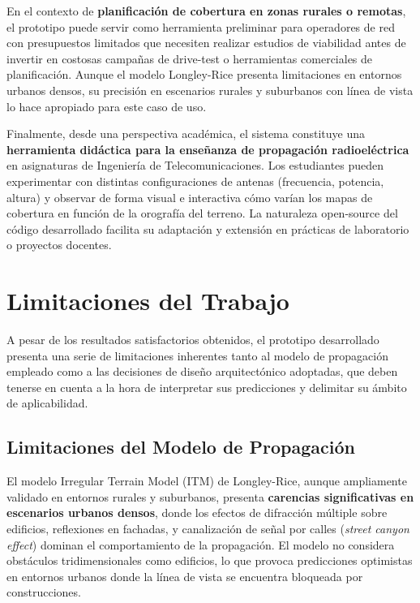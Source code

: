 En el contexto de \textbf{planificación de cobertura en zonas rurales o remotas}, el prototipo puede servir como herramienta preliminar para operadores de red con presupuestos limitados que necesiten realizar estudios de viabilidad antes de invertir en costosas campañas de drive-test o herramientas comerciales de planificación. Aunque el modelo Longley-Rice presenta limitaciones en entornos urbanos densos, su precisión en escenarios rurales y suburbanos con línea de vista lo hace apropiado para este caso de uso.

Finalmente, desde una perspectiva académica, el sistema constituye una \textbf{herramienta didáctica para la enseñanza de propagación radioeléctrica} en asignaturas de Ingeniería de Telecomunicaciones. Los estudiantes pueden experimentar con distintas configuraciones de antenas (frecuencia, potencia, altura) y observar de forma visual e interactiva cómo varían los mapas de cobertura en función de la orografía del terreno. La naturaleza open-source del código desarrollado facilita su adaptación y extensión en prácticas de laboratorio o proyectos docentes.

\section{Limitaciones del Trabajo}
\label{sec:limitaciones_trabajo}

A pesar de los resultados satisfactorios obtenidos, el prototipo desarrollado presenta una serie de limitaciones inherentes tanto al modelo de propagación empleado como a las decisiones de diseño arquitectónico adoptadas, que deben tenerse en cuenta a la hora de interpretar sus predicciones y delimitar su ámbito de aplicabilidad.

\subsection*{Limitaciones del Modelo de Propagación}

El modelo Irregular Terrain Model (ITM) de Longley-Rice, aunque ampliamente validado en entornos rurales y suburbanos, presenta \textbf{carencias significativas en escenarios urbanos densos}, donde los efectos de difracción múltiple sobre edificios, reflexiones en fachadas, y canalización de señal por calles (\textit{street canyon effect}) dominan el comportamiento de la propagación. El modelo no considera obstáculos tridimensionales como edificios, lo que provoca predicciones optimistas en entornos urbanos donde la línea de vista se encuentra bloqueada por construcciones.

